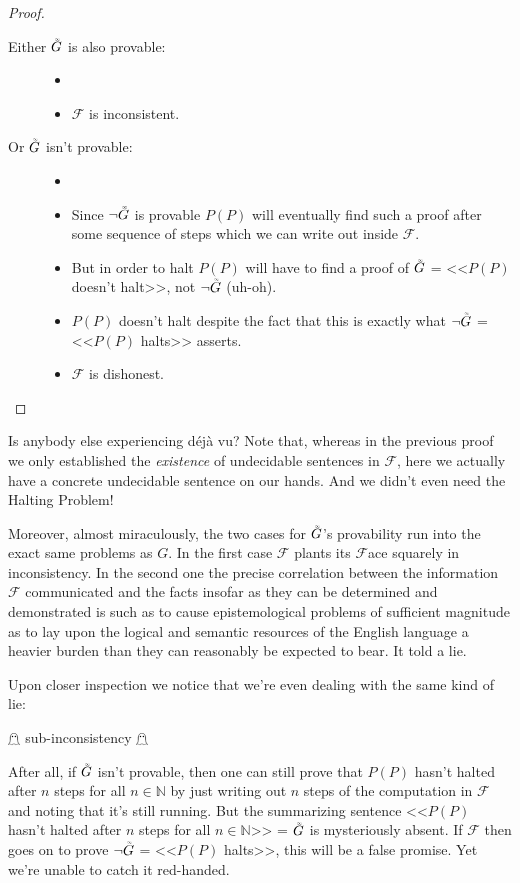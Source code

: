 \documentclass{article}
\theoremstyle{customstyle}
\newcommand{\F}{\ensuremath{\mathcal{F}}}
\newcommand{\iGoedel}{\ensuremath{\accentset{\scalebox{0.35}{$\infty$}}{G}}}
\begin{document}
\begin{proof}
\begin{description}
\begin{description}
\item[]
\item[Either $\iGoedel$ is also provable:]
\begin{itemize}
\item[]
\item $\F$ is inconsistent. \lightning
\end{itemize}
\item[Or $\iGoedel$ isn't provable:]
\begin{itemize}
\item[]
\item Since $\neg \iGoedel$ is provable $P(P)$ will eventually find such a proof after some sequence of steps which we can write out inside $\F$.
\item But in order to halt $P(P)$ will have to find a proof of $\iGoedel$ = <<$P(P)$ doesn't halt>>, not $\neg \iGoedel$ (uh-oh).
\item $P(P)$ doesn't halt despite the fact that this is exactly what $\neg \iGoedel$ = <<$P(P)$ halts>> asserts.
\item $\F$ is dishonest. \lightning\qedhere
\end{itemize}
\end{description}
\end{description}
\end{proof}

Is anybody else experiencing déjà vu? Note that, whereas in the previous proof we only established the \textit{existence} of undecidable sentences in $\F$, here we actually have a concrete undecidable sentence on our hands. And we didn't even need the Halting Problem!

Moreover, almost miraculously, the two cases for $\iGoedel$'s provability run into the exact same problems as $G$. In the first case $\F$ plants its $\F$ace squarely in inconsistency. In the second one the precise correlation between the information $\F$ communicated and the facts insofar as they can be determined and demonstrated is such as to cause epistemological problems of sufficient magnitude as to lay upon the logical and semantic resources of the English language a heavier burden than they can reasonably be expected to bear. It told a lie.\cite{yes-prime-minister}

Upon closer inspection we notice that we're even dealing with the same kind of lie:
\begin{center}
$\mathghost$ sub-inconsistency $\mathghost$
\end{center}
After all, if $\iGoedel$ isn't provable, then one can still prove that $P(P)$ hasn't halted after $n$ steps for all $n\in\mathbb{N}$ by just writing out $n$ steps of the computation in $\F$ and noting that it's still running. But the summarizing sentence <<$P(P)$ hasn't halted after $n$ steps for all $n\in\mathbb{N}$>> = $\iGoedel$ is mysteriously absent. If $\F$ then goes on to prove $\neg \iGoedel$ = <<$P(P)$ halts>>, this will be a false promise. Yet we're unable to catch it red-handed.
\end{document}
